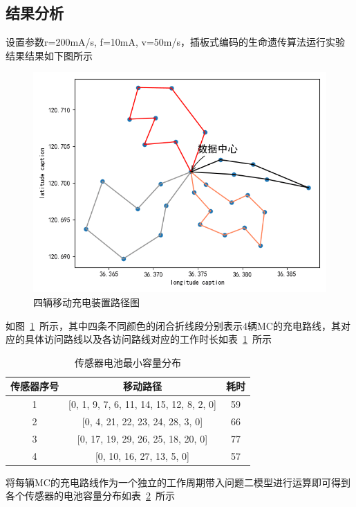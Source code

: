\documentclass{whutmod}
\begin{document}
\begin{table}[H]
\begin{tablenotes}
  		\subsection{结果分析}
  	设置参数r=200mA/s, f=10mA, v=50m/s，插板式编码的生命遗传算法运行实验结果结果如下图所示  	
  \begin{figure}[H]
  	\centering
  	\includegraphics[width=.8\textwidth]{figures/s3.png}
  	\caption{四辆移动充电装置路径图}\label{gdfsdf}
  \end{figure}
  如图~\ref{gdfsdf}~所示，其中四条不同颜色的闭合折线段分别表示4辆MC的充电路线，其对应的具体访问路线以及各访问路线对应的工作时长如表~\ref{bidsao2}~所示
  		\begin{table}[H]
	\centering		
	\caption{每个传感器的移动路径}\label{bidsao2}
	\begin{tabular}{ccc}
		\toprule[2pt]
		\multicolumn{1}{m{2.5cm}}{\centering 传感器序号}
		& \multicolumn{1}{m{4.5cm}}{\centering 移动路径}& \multicolumn{1}{m{2.5cm}}{\centering 耗时}
		\\
		\midrule[1pt]
		1 &   [0, 1, 9, 7, 6, 11, 14, 15, 12, 8, 2, 0]& 59\\ 
		2&  [0, 4, 21, 22, 23, 24, 28, 3, 0]
		&66\\ 
		3&   [0, 17, 19, 29, 26, 25, 18, 20, 0]& 77 \\ 
		4& [0, 10, 16, 27, 13, 5, 0]& 57 \\ 
		\bottomrule[2pt]	
	\end{tabular}
\end{table}
将每辆MC的充电路线作为一个独立的工作周期带入问题二模型进行运算即可得到各个传感器的电池容量分布如表~\ref{adfs}~所示
  		\begin{table}[H]
  	\centering		
  	\caption{传感器电池最小容量分布}\label{adfs}

\end{table}
\end{tablenotes}
\end{table}
\end{document}
